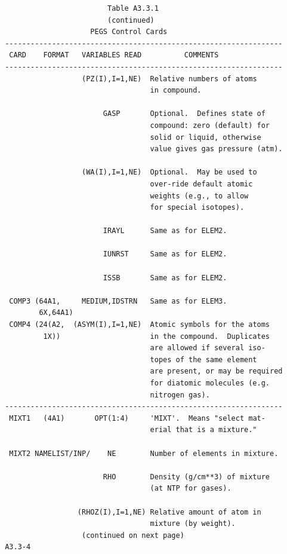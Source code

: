 \newpage {} \begin{verbatim}
                         Table A3.3.1
                         (continued)
                     PEGS Control Cards
 -----------------------------------------------------------------
  CARD    FORMAT   VARIABLES READ          COMMENTS
 -----------------------------------------------------------------
                   (PZ(I),I=1,NE)  Relative numbers of atoms
                                   in compound.

                        GASP       Optional.  Defines state of
                                   compound: zero (default) for
                                   solid or liquid, otherwise
                                   value gives gas pressure (atm).

                   (WA(I),I=1,NE)  Optional.  May be used to
                                   over-ride default atomic
                                   weights (e.g., to allow
                                   for special isotopes).

                        IRAYL      Same as for ELEM2.

                        IUNRST     Same as for ELEM2.

                        ISSB       Same as for ELEM2.

  COMP3 (64A1,     MEDIUM,IDSTRN   Same as for ELEM3.
         6X,64A1)
  COMP4 (24(A2,  (ASYM(I),I=1,NE)  Atomic symbols for the atoms
          1X))                     in the compound.  Duplicates
                                   are allowed if several iso-
                                   topes of the same element
                                   are present, or may be required
                                   for diatomic molecules (e.g.
                                   nitrogen gas).
 -----------------------------------------------------------------
  MIXT1   (4A1)       OPT(1:4)     'MIXT'.  Means "select mat-
                                   erial that is a mixture."

  MIXT2 NAMELIST/INP/    NE        Number of elements in mixture.

                        RHO        Density (g/cm**3) of mixture
                                   (at NTP for gases).

                  (RHOZ(I),I=1,NE) Relative amount of atom in
                                   mixture (by weight).
                   (continued on next page)
 A3.3-4
\end{verbatim}
